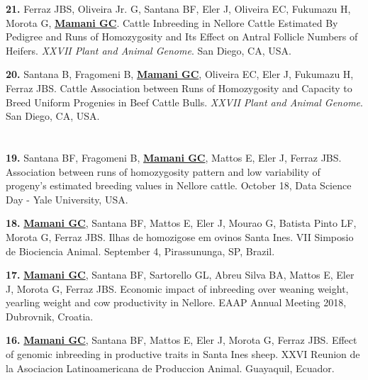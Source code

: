 \documentclass[margin,line,10pt]{res}
\newenvironment{list1}{
  \begin{list}{\ding{113}}{%
      \setlength{\itemsep}{0in}
      \setlength{\parsep}{0in} \setlength{\parskip}{0in}
      \setlength{\topsep}{0in} \setlength{\partopsep}{0in} 
      \setlength{\leftmargin}{0.17in}}}{\end{list}}
\begin{document}
\begin{resume}
\begin{list1}
\item [\bf{21}.] Ferraz JBS, Oliveira Jr. G, Santana BF, Eler J, Oliveira EC, Fukumazu H, Morota G, {\bf \underline{Mamani GC}}. Cattle Inbreeding in Nellore Cattle Estimated By Pedigree and Runs of Homozygosity and Its Effect on Antral Follicle Numbers of Heifers. {\it XXVII Plant and Animal Genome}. San Diego, CA, USA. 
\vspace{0.5cm}

\item [\bf{20}.] Santana B, Fragomeni B, {\bf \underline{Mamani GC}}, Oliveira EC, Eler J, Fukumazu H, Ferraz JBS. Cattle Association between Runs of Homozygosity and Capacity to Breed Uniform Progenies in Beef Cattle Bulls. {\it XXVII Plant and Animal Genome}. San Diego, CA, USA.

\end{list1}

\section{}

\begin{list1}

\item [\bf{19}.] Santana BF, Fragomeni B, {\bf \underline{Mamani GC}},  Mattos E, Eler J, Ferraz JBS.
Association between runs of homozygosity pattern and low variability of progeny’s estimated breeding values in Nellore cattle. October 18, Data Science Day - Yale University, USA. 
\vspace{0.5cm}

\item [\bf{18}.] {\bf \underline{Mamani GC}}, Santana BF, Mattos E, Eler J, Mourao G, Batista Pinto LF, Morota G, Ferraz JBS. Ilhas de homozigose em ovinos Santa Ines.
VII Simposio de Biociencia Animal. September 4, Pirassununga, SP, Brazil. 
\vspace{0.5cm}

\item [\bf{17}.] {\bf \underline{Mamani GC}}, Santana BF, Sartorello GL, Abreu Silva BA, Mattos E, Eler J, Morota G, Ferraz JBS. Economic impact of inbreeding over weaning weight, yearling weight and cow productivity in Nellore. EAAP Annual Meeting 2018, Dubrovnik, Croatia. 
\vspace{0.5cm}

\item [\bf{16}.] {\bf \underline{Mamani GC}}, Santana BF, Mattos E, Eler J, Morota G, Ferraz JBS. Effect of genomic inbreeding in productive traits in Santa Ines sheep.
XXVI Reunion de la Asociacion Latinoamericana de Produccion Animal. Guayaquil, Ecuador. 
\vspace{0.5cm}


\end{list1}
\end{resume}
\end{document}
